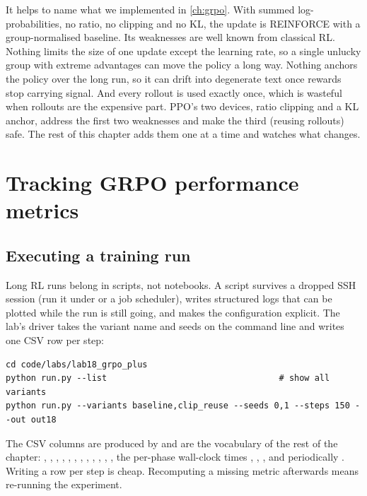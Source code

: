 It helps to name what we implemented in \cref{ch:grpo}. With summed log-probabilities, no
ratio, no clipping and no KL, the update is REINFORCE with a group-normalised baseline. Its
weaknesses are well known from classical RL. Nothing limits the size of one update except
the learning rate, so a single unlucky group with extreme advantages can move the policy a
long way. Nothing anchors the policy over the long run, so it can drift into degenerate text
once rewards stop carrying signal. And every rollout is used exactly once, which is wasteful
when rollouts are the expensive part. PPO's two devices, ratio clipping and a KL anchor,
address the first two weaknesses and make the third (reusing rollouts) safe. The rest of this
chapter adds them one at a time and watches what changes.

\section{Tracking GRPO performance metrics}\label{sec:grpo2:metrics}

\subsection{Executing a training run}\label{sec:grpo2:exec}

Long RL runs belong in scripts, not notebooks. A script survives a dropped SSH session
(run it under  or a job scheduler), writes structured logs that can be plotted
while the run is still going, and makes the configuration explicit. The lab's driver takes
the variant name and seeds on the command line and writes one CSV row per step:

\begin{lstlisting}[style=shell,caption={Running GRPO variants from the terminal.},label={lst:grpo2:run}]
cd code/labs/lab18_grpo_plus
python run.py --list                                  # show all variants
python run.py --variants baseline,clip_reuse --seeds 0,1 --steps 150 --out out18
\end{lstlisting}

The CSV columns are produced by  and are the vocabulary of the rest
of the chapter: , , , ,
, , , ,
, , , , the per-phase
wall-clock times , , , and periodically
. Writing a row per step is cheap. Recomputing a missing metric afterwards
means re-running the experiment.

